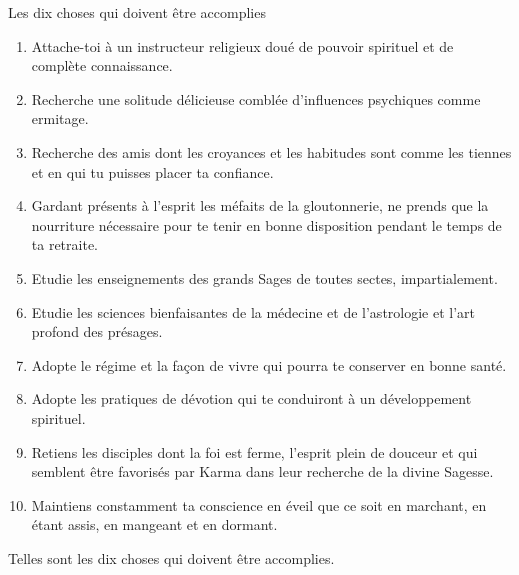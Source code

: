 \documentclass[10pt]{book}
\makeatletter
\renewcommand{\section}{\@startsection{section}{0}{0mm}
   {\baselineskip}
   {\baselineskip}{\normalfont\normalsize\scshape\centering}
}
\makeatother
\begin{document}
\section{Les dix choses qui doivent être accomplies}
\begin{enumerate}[1.-]
\item Attache-toi à un instructeur religieux doué de pouvoir spirituel et de complète connaissance.
\item Recherche une solitude délicieuse comblée d'influences psychiques comme ermitage.
\item Recherche des amis dont les croyances et les habitudes sont comme les tiennes et en qui tu puisses placer ta confiance.
\item Gardant présents à l'esprit les méfaits de la gloutonnerie, ne prends que la nourriture nécessaire pour te tenir en bonne disposition pendant le temps de ta retraite.
\item Etudie les enseignements des grands Sages de toutes sectes, impartialement.
\item Etudie les sciences bienfaisantes de la médecine et de l'astrologie et l'art profond des présages.
\item Adopte le régime et la façon de vivre qui pourra te conserver en bonne santé.
\item Adopte les pratiques de dévotion qui te conduiront à un développement spirituel.
\item Retiens les disciples dont la foi est ferme, l'esprit plein de douceur et qui semblent être favorisés par Karma dans leur recherche de la divine Sagesse.
\item Maintiens constamment ta conscience en éveil que ce soit en marchant, en étant assis, en mangeant et en dormant.
\end{enumerate}
Telles sont les dix choses qui doivent être accomplies.
\end{document}
